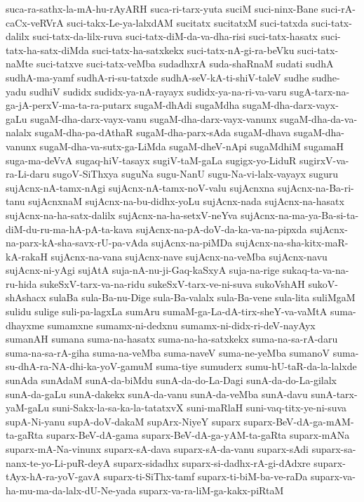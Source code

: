 {suca-ra-sathx-la-mA-hu-rAyARH
suca-ri-tarx-yuta
suciM
suci-ninx-Bane
suci-rA-caCx-veRVrA
suci-takx-Le-ya-lalxdAM
sucitatx
sucitatxM
suci-tatxda
suci-tatx-dalilx
suci-tatx-da-lilx-ruva
suci-tatx-diM-da-va-dha-risi
suci-tatx-hasatx
suci-tatx-ha-satx-diMda
suci-tatx-ha-satxkekx
suci-tatx-nA-gi-ra-beVku
suci-tatx-naMte
suci-tatxve
suci-tatx-veMba
sudadhxrA
suda-shaRnaM
sudati
sudhA
sudhA-ma-yamf
sudhA-ri-su-tatxde
sudhA-seV-kA-ti-shiV-taleV
sudhe
sudhe-yadu
sudhiV
sudidx
sudidx-ya-nA-rayayx
sudidx-ya-na-ri-va-varu
sugA-tarx-na-ga-jA-perxV-ma-ta-ra-putarx
sugaM-dhAdi
sugaMdha
sugaM-dha-darx-vayx-gaLu
sugaM-dha-darx-vayx-vanu
sugaM-dha-darx-vayx-vanunx
sugaM-dha-da-va-nalalx
sugaM-dha-pa-dAthaR
sugaM-dha-parx-sAda
sugaM-dhava
sugaM-dha-vanunx
sugaM-dha-va-sutx-ga-LiMda
sugaM-dheV-nApi
sugaMdhiM
sugamaH
suga-ma-deVvA
sugaq-hiV-tasayx
sugiV-taM-gaLa
sugigx-yo-LiduR
sugirxV-va-ra-Li-daru
sugoV-SiThxya
suguNa
sugu-NanU
sugu-Na-vi-lalx-vayayx
suguru
sujAcnx-nA-tamx-nAgi
sujAcnx-nA-tamx-noV-valu
sujAcnxna
sujAcnx-na-Ba-ri-tanu
sujAcnxnaM
sujAcnx-na-bu-didhx-yoLu
sujAcnx-nada
sujAcnx-na-hasatx
sujAcnx-na-ha-satx-dalilx
sujAcnx-na-ha-setxV-neYva
sujAcnx-na-ma-ya-Ba-si-ta-diM-du-ru-ma-hA-pA-ta-kava
sujAcnx-na-pA-doV-da-ka-va-na-pipxda
sujAcnx-na-parx-kA-sha-savx-rU-pa-vAda
sujAcnx-na-piMDa
sujAcnx-na-sha-kitx-maR-kA-rakaH
sujAcnx-na-vana
sujAcnx-nave
sujAcnx-na-veMba
sujAcnx-navu
sujAcnx-ni-yAgi
sujAtA
suja-nA-nu-ji-Gaq-kaSxyA
suja-na-rige
sukaq-ta-va-na-ru-hida
sukeSxV-tarx-va-na-ridu
sukeSxV-tarx-ve-ni-suva
sukoVshAH
sukoV-shAshacx
sulaBa
sula-Ba-nu-Dige
sula-Ba-valalx
sula-Ba-vene
sula-lita
suliMgaM
sulidu
sulige
suli-pa-lagxLa
sumAru
sumaM-ga-La-dA-tirx-sheY-va-vaMtA
suma-dhayxme
sumamxne
sumamx-ni-dedxnu
sumamx-ni-didx-ri-deV-nayAyx
sumanAH
sumana
suma-na-hasatx
suma-na-ha-satxkekx
suma-na-sa-rA-daru
suma-na-sa-rA-giha
suma-na-veMba
suma-naveV
suma-ne-yeMba
sumanoV
suma-su-dhA-ra-NA-dhi-ka-yoV-gamuM
suma-tiye
sumuderx
sumu-hU-taR-da-la-lalxde
sunAda
sunAdaM
sunA-da-biMdu
sunA-da-do-La-Dagi
sunA-da-do-La-gilalx
sunA-da-gaLu
sunA-dakekx
sunA-da-vanu
sunA-da-veMba
sunA-davu
sunA-tarx-yaM-gaLu
suni-Sakx-la-sa-ka-la-tatatxvX
suni-maRlaH
suni-vaq-titx-ye-ni-suva
supA-Ni-yanu
supA-doV-dakaM
supArx-NiyeY
suparx
suparx-BeV-dA-ga-mAM-ta-gaRta
suparx-BeV-dA-gama
suparx-BeV-dA-ga-yAM-ta-gaRta
suparx-mANa
suparx-mA-Na-vinunx
suparx-sA-dava
suparx-sA-da-vanu
suparx-sAdi
suparx-sa-nanx-te-yo-Li-puR-deyA
suparx-sidadhx
suparx-si-dadhx-rA-gi-dAdxre
suparx-tAyx-hA-ra-yoV-gavA
suparx-ti-SiThx-tamf
suparx-ti-biM-ba-ve-raDa
suparx-va-ha-mu-ma-da-lalx-dU-Ne-yada
suparx-va-ra-liM-ga-kakx-piRtaM
}

